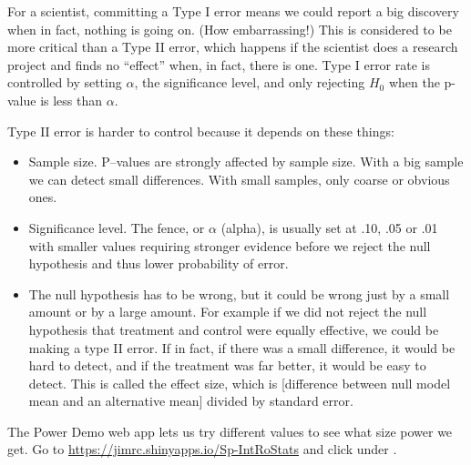 For a scientist, committing a Type I error means we could report a
big discovery when in fact, nothing is going on. (How embarrassing!)
This is considered to be more critical than a Type II error, which happens if
the scientist does a research project and finds no ``effect'' when, in
fact, there is one. Type I error rate is controlled by setting
$\alpha$, the significance level, and only rejecting $H_0$ when the
p-value is less than $\alpha$. 


Type II error is harder to control because it depends on these things:
\vspace{-.2cm}
\begin{itemize}
\item  Sample size.  P--values are strongly affected by sample
  size. With a big sample we can detect small differences.  With small
  samples, only coarse or obvious ones.
\item  Significance level.  The fence, or $\alpha$ (alpha), is
  usually set at .10, .05 or .01 with smaller values requiring
  stronger evidence before we reject the null hypothesis and thus
  lower probability of error.  
\item  The null hypothesis has to be wrong, but it could be wrong just
  by a small amount or by a large amount.  For example if 
   we did not reject the null hypothesis that treatment and
  control  were equally effective,  we could be making a type II
  error.  If in fact, if there was a small difference, it would be
  hard to detect, and if the treatment was far better, it would
  be easy to detect.  This is called the effect size, which is
  [difference between null model mean and an alternative mean] divided
  by standard error.
\end{itemize}


The Power Demo web app lets us try different values to see what size
power we get.  Go to 
\url{https://jimrc.shinyapps.io/Sp-IntRoStats} and click
 under .

